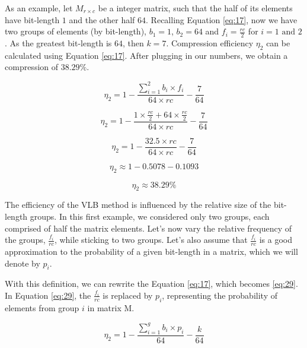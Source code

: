 \documentclass[10pt]{article}
\begin{document}
As an example, let $M_{r\times c}$ be a integer matrix, such that the half of 
its elements have bit-length $1$ and the other half $64$. Recalling Equation 
\ref{eq:17}, now we have two groups of elements (by bit-length), $b_1=1 $, 
$b_2=64$ and $f_i = \frac{rc}{2}$ for $i = 1 \text{ and } 2$. As the greatest 
bit-length is $64$, then $k=7$. Compression efficiency $\eta_2$ can be 
calculated using Equation \ref{eq:17}. After plugging in our numbers, we obtain 
a compression of $38.29\%$.

\begin{equation*}\label{eq:25}
 \eta_2 = 1 - \frac{\sum_{i=1}^{2}  b_i \times f_i }{64 \times rc} - \frac{7}{64} 
\end{equation*}

\begin{equation*}\label{eq:26}
 \eta_2 = 1 - \frac{  1 \times \frac{rc}{2} + 64 \times \frac{rc}{2} }{64 \times rc} - \frac{7}{64} 
\end{equation*}

\begin{equation*}\label{eq:26}
 \eta_2 = 1 - \frac{  32.5  \times rc }{64 \times rc} - \frac{7}{64} 
\end{equation*}

\begin{equation*}\label{eq:27}
 \eta_2 \approx 1 - 0.5078 - 0.1093
\end{equation*}

\begin{equation*}\label{eq:28}
 \eta_2 \approx 38.29\%
\end{equation*}

The efficiency of the VLB method is influenced by the relative size of the 
bit-length groups. In this first example, we considered only two groups, each 
comprised of half the matrix elements. Let's now vary the relative frequency of 
the groups, $\frac{f_i}{rc}$, while sticking to two groups. Let's 
also assume that $\frac{f_i}{rc}$ is a good approximation to the 
probability of a given bit-length in a matrix, which we will denote by $p_i$.

With this definition, we can rewrite the Equation \ref{eq:17}, which becomes 
\ref{eq:29}. In Equation \ref{eq:29}, the $\frac{f_i}{rc}$ is replaced by $p_i$, 
representing the probability of elements from group $i$ in matrix M.

\begin{equation}\label{eq:29}
 \eta_2 = 1 - \frac{\sum_{i=1}^{g}  b_i \times p_i }{64} - \frac{k}{64} 
\end{equation}
\end{document}
